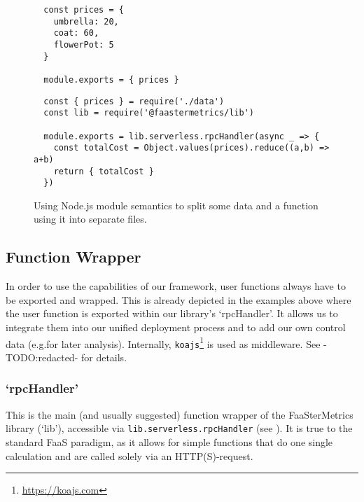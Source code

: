 \documentclass[../main.tex]{subfiles}
\begin{document}
\begin{figure}
\begin{tcolorbox}[left=3mm, right=3mm, top=3mm]
  \begin{tcolorbox}[titleDetachedStyle, title=\texttt{{[\ldots]/exampleFunction/data.js}}]
  \begin{verbatim}
  const prices = {
    umbrella: 20,
    coat: 60,
    flowerPot: 5
  }

  module.exports = { prices }
  \end{verbatim}
  \end{tcolorbox}

  \begin{tcolorbox}[titleDetachedStyle, title=\texttt{{[\ldots]/exampleFunction/index.js}}]
  \begin{verbatim}
  const { prices } = require('./data')
  const lib = require('@faastermetrics/lib')

  module.exports = lib.serverless.rpcHandler(async _ => {
    const totalCost = Object.values(prices).reduce((a,b) => a+b)
    return { totalCost }
  })
  \end{verbatim}
  \end{tcolorbox}

\end{tcolorbox}
\caption{Using Node.js module semantics to split some data and a function using it into separate files.}%
\label{fig:dividingDataAndFunctionCodeNodeJS}
\end{figure}

\subsection{Function Wrapper}\label{sub:jsFunctionWrapper}

In order to use the capabilities of our framework, user functions always have to be exported and wrapped.
This is already depicted in the examples above where the user function is exported within our library's `rpcHandler'.
It allows us to integrate them into our unified deployment process and to add our own control data (e.g.\@ for later analysis).
Internally, \texttt{koajs}\footnote{\url{https://koajs.com}} is used as middleware. See -TODO:\@ redacted- for details.

\subsubsection{`rpcHandler'}%
\label{ssub:rpcHandler}
This is the main (and usually suggested) function wrapper of the FaaSterMetrics library (`lib'), 
accessible via \texttt{lib.serverless.rpcHandler} (see ).
It is true to the standard FaaS paradigm, as it allows for simple functions 
that do one single calculation and are called solely via an HTTP(S)-request.
\end{document}
